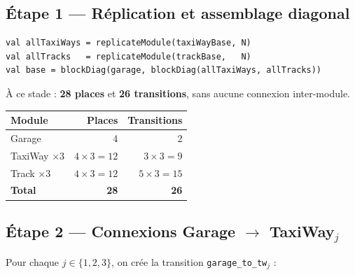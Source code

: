 \documentclass[a4paper,12pt]{article}
\begin{document}
\subsection{Étape 1 --- Réplication et assemblage diagonal}

\begin{lstlisting}
val allTaxiWays = replicateModule(taxiWayBase, N)
val allTracks   = replicateModule(trackBase,   N)
val base = blockDiag(garage, blockDiag(allTaxiWays, allTracks))
\end{lstlisting}

À ce stade : \textbf{28 places} et \textbf{26 transitions}, sans aucune connexion inter-module.

\begin{center}
\begin{tabular}{lrr}
\toprule
\textbf{Module} & \textbf{Places} & \textbf{Transitions} \\
\midrule
Garage           & 4           & 2  \\
TaxiWay $\times 3$ & $4 \times 3 = 12$ & $3 \times 3 = 9$  \\
Track $\times 3$   & $4 \times 3 = 12$ & $5 \times 3 = 15$ \\
\midrule
\textbf{Total}   & \textbf{28} & \textbf{26} \\
\bottomrule
\end{tabular}
\end{center}

\subsection{Étape 2 --- Connexions Garage $\to$ TaxiWay$_j$}

Pour chaque $j \in \{1, 2, 3\}$, on crée la transition \texttt{garage\_to\_tw}$_j$ :
\end{document}
